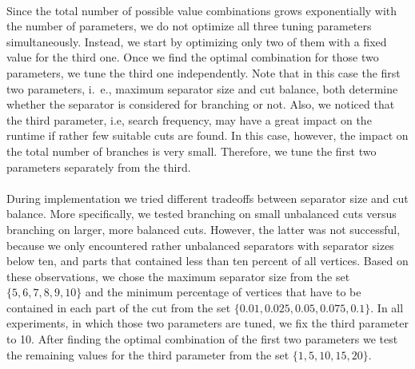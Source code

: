 \documentclass[12pt,a4paper,twoside]{scrartcl}
\numberwithin{equation}{section}
\begin{document}
\paragraph{}
Since the total number of possible value combinations grows exponentially with the number of parameters, we do not optimize all three tuning parameters simultaneously. Instead, we start by optimizing only two of them with a fixed value for the third one. Once we find the optimal combination for those two parameters, we tune the third one independently. Note that in this case the first two parameters, i.~e., maximum separator size and cut balance, both determine whether the separator is considered for branching or not. Also, we noticed that the third parameter, i.e, search frequency, may have a great impact on the runtime if rather few suitable cuts are found. In this case, however, the impact on the total number of branches is very small. Therefore, we tune the first two parameters separately from the third.

\paragraph{}
During implementation we tried different tradeoffs between separator size and cut balance. More specifically, we tested branching on small unbalanced cuts versus branching on larger, more balanced cuts. However, the latter was not successful, because we only encountered rather unbalanced separators with separator sizes below ten, and parts that contained less than ten percent of all vertices. Based on these observations, we chose the maximum separator size from the set $\{5,6,7,8,9,10\} $ and the minimum percentage of vertices that have to be contained in each part of the cut from the set $\{0.01, 0.025, 0.05, 0.075, 0.1\}$. In all experiments, in which those two parameters are tuned, we fix the third parameter to 10. After finding the optimal combination of the first two parameters we test the remaining values for the third parameter from the set $\{1,5,10,15,20\}$.
\end{document}
